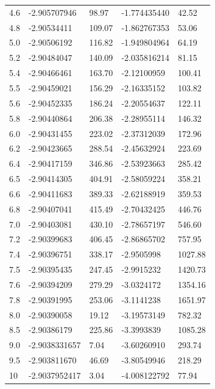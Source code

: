 \documentclass{pracalicmgr}
\begin{document}
\begin{longtable}[c]{lllll}
    4.6 & -2.905707946   & 98.97  & -1.774435440   & 42.52   \\
    4.8 & -2.90534411    & 109.07 & -1.862767353   & 53.06   \\
    5.0 & -2.90506192    & 116.82 & -1.949804964   & 64.19   \\
    5.2 & -2.90484047    & 140.09 & -2.035816214   & 81.15   \\
    5.4 & -2.90466461    & 163.70 & -2.12100959    & 100.41  \\
    5.5 & -2.90459021    & 156.29 & -2.16335152    & 103.82  \\
    5.6 & -2.90452335    & 186.24 & -2.20554637    & 122.11  \\
    5.8 & -2.90440864    & 206.38 & -2.28955114    & 146.32  \\
    6.0 & -2.90431455    & 223.02 & -2.37312039    & 172.96  \\
    6.2 & -2.90423665    & 288.54 & -2.45632924    & 223.69  \\
    6.4 & -2.90417159    & 346.86 & -2.53923663    & 285.42  \\
    6.5 & -2.90414305    & 404.91 & -2.58059224    & 358.21  \\
    6.6 & -2.90411683    & 389.33 & -2.62188919    & 359.53  \\
    6.8 & -2.90407041    & 415.49 & -2.70432425    & 446.76  \\
    7.0 & -2.90403081    & 430.10 & -2.78657197    & 546.60  \\
    7.2 & -2.90399683    & 406.45 & -2.86865702    & 757.95  \\
    7.4 & -2.90396751    & 338.17 & -2.9505998     & 1027.88 \\
    7.5 & -2.90395435    & 247.45 & -2.9915232     & 1420.73 \\
    7.6 & -2.90394209    & 279.29 & -3.0324172     & 1354.16 \\
    7.8 & -2.90391995    & 253.06 & -3.1141238     & 1651.97 \\
    8.0 & -2.90390058    & 19.12  & -3.19573149    & 782.32  \\
    8.5 & -2.90386179    & 225.86 & -3.3993839     & 1085.28 \\
    9.0 & -2.9038331657  & 7.04   & -3.60260910    & 293.74  \\
    9.5 & -2.903811670   & 46.69  & -3.80549946    & 218.29  \\
    10  & -2.9037952417  & 3.04   & -4.008122792   & 77.94   \\

\end{longtable}
\end{document}
